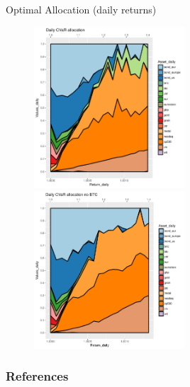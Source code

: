 \documentclass{beamer}
\begin{document}
\begin{frame}{Optimal Allocation (daily returns)}
\begin{figure}
	\includegraphics[width=0.5\textwidth]{allocation_daily_btc.pdf}
	\includegraphics[width=0.5\textwidth]{allocation_daily_nobtc.pdf}
\end{figure}
\end{frame}

\begin{frame}[allowframebreaks] %
\frametitle{References}

\scriptsize{}


\end{frame}
\end{document}
